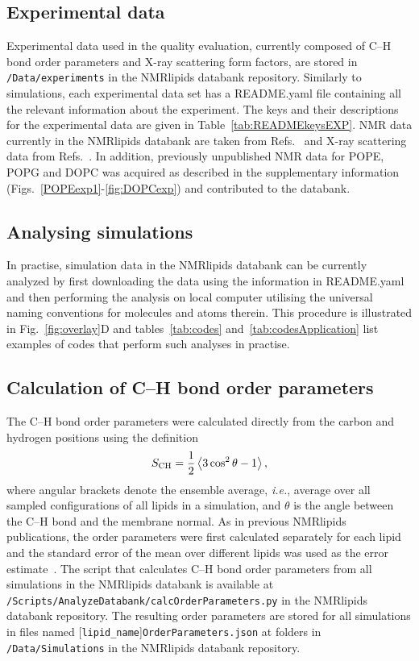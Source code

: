 \documentclass[fleqn,10pt]{wlscirep}
\begin{document}
\subsection{Experimental data}
Experimental data used in the quality evaluation, currently composed of C--H bond order parameters and X-ray scattering form factors, are stored in \texttt{/Data/experiments} in the NMRlipids databank repository. Similarly to simulations, each experimental data set has a README.yaml file containing all the relevant information about the experiment. The keys and their descriptions for the experimental data are given in Table~\ref{tab:READMEkeysEXP}. NMR data currently in the NMRlipids databank are taken from Refs.~ and X-ray scattering data from Refs.~. In addition, previously unpublished NMR data for POPE, POPG and DOPC was acquired as described in the supplementary information (Figs.~\ref{POPEexp1}-\ref{fig:DOPCexp}) and contributed to the databank. 


\subsection{Analysing simulations}
In practise, simulation data in the NMRlipids databank can be currently analyzed by first downloading the data using the information in README.yaml and then performing the analysis on local computer utilising the universal naming conventions for molecules and atoms therein. This procedure is illustrated in Fig.~\ref{fig:overlay}D and tables~\ref{tab:codes} and~\ref{tab:codesApplication} list examples of codes that perform such analyses in practise.

\subsection{Calculation of C--H bond order parameters}
The C--H bond order parameters were calculated directly from the carbon and hydrogen positions using the definition
\begin{equation}\label{OP}
S_{\rm CH}=\frac{1}{2}\left\langle 3\cos^2\theta -1 \right\rangle,
\end{equation}
where angular brackets denote the ensemble average, \textit{i.e.}, average over all sampled configurations of all lipids in a simulation, and $\theta$ is the angle between the C--H bond and the membrane normal. As in previous NMRlipids publications, the order parameters were first calculated separately for each lipid and the standard error of the mean over different lipids was used as the error estimate~\cite{botan15}. The script that calculates C--H bond order parameters from all simulations in the NMRlipids databank is available at \texttt{/Scripts/AnalyzeDatabank/calcOrderParameters.py} in the NMRlipids databank repository. The resulting order parameters are stored for all simulations in files named %
[\texttt{lipid\_name}]\texttt{OrderParameters.json} at folders in \texttt{/Data/Simulations} in the NMRlipids databank repository.
\end{document}
